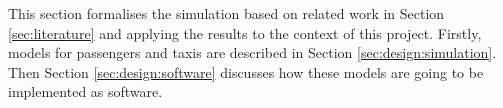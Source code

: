 This section formalises the simulation based on related work in Section
\ref{sec:literature} and applying the results to the context of this project.
Firstly, models for passengers and taxis are described in Section
\ref{sec:design:simulation}. Then Section \ref{sec:design:software} discusses
how these models are going to be implemented as software.

